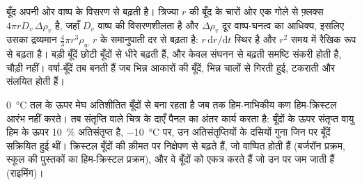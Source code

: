 \begin{remark}[केवल संघनन वर्षा क्यों नहीं बनाता]\label{rem:b2:atmospheric-thermodynamics:growth}
बूँद अपनी ओर वाष्प के विसरण से बढ़ती है। त्रिज्या $r$ की बूँद के चारों ओर एक गोले से
फ़्लक्स $4\pi r D_v\,\Delta\rho_v$ है, जहाँ $D_v$ वाष्प की विसरणशीलता है और
$\Delta\rho_v$ दूर वाष्प-घनत्व का आधिक्य, इसलिए उसका द्रव्यमान $\tfrac43\pi r^3\rho_w$
$r$ के समानुपाती दर से बढ़ता है: $r\,\mathrm{d}r/\mathrm{d}t$ स्थिर है और $r^2$ समय में रैखिक रूप से
बढ़ता है। बड़ी बूँदें छोटी बूँदों से धीरे बढ़ती हैं, और केवल संघनन से बढ़ती समष्टि
संकरी होती है, चौड़ी नहीं। वर्षा-बूँदें तब बनती हैं जब भिन्न आकारों की बूँदें, भिन्न
चालों से गिरती हुई, टकराती और संलयित होती हैं।
\end{remark}

\qty{0}{\celsius} तल के ऊपर मेघ अतिशीतित बूँदों से बना रहता है जब तक हिम-नाभिकीय
कण हिम-क्रिस्टल आरंभ नहीं करते। तब संतृप्ति वाले चित्र के दाएँ पैनल का
अंतर कार्य करता है: बूँदों के ऊपर संतृप्त वायु हिम के ऊपर
\qty{10}{\percent} अतिसंतृप्त है, \qty{-10}{\celsius} पर, उन अतिसंतृप्तियों के दसियों गुना जिन पर बूँदें सक्रियित हुई थीं।
क्रिस्टल बूँदों की क़ीमत पर निक्षेपण से बढ़ते हैं, जो वाष्पित होती हैं (बर्जरॉन
प्रक्रम, स्कूल की पुस्तकों का हिम-क्रिस्टल प्रक्रम), और वे बूँदों को एकत्र करते हैं जो उन पर
जम जाती हैं (राइमिंग)।

